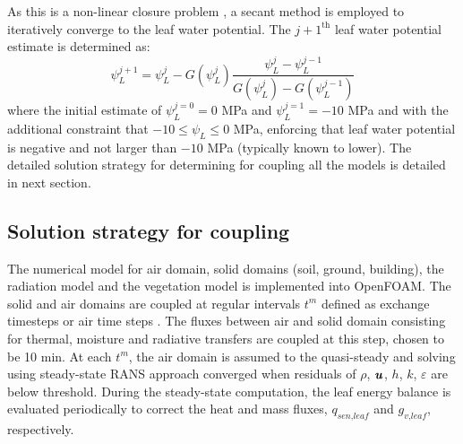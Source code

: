 As this is a non-linear closure problem \citep{Manoli2014},  a secant method is employed to iteratively converge to the leaf water potential. The $j+1^\mathrm{th}$ leaf water potential estimate is determined as:
\begin{equation}
\psi_L^{j+1} = \psi_L^{j} - G(\psi_L^j) \frac{\psi_L^j - \psi_L^{j-1}}{G\left(\psi_L^j\right) - G\left(\psi_L^{j-1}\right) }
\end{equation}
where the initial estimate of $\psi_L^{j=0} = 0$ MPa and $\psi_L^{j=1} = -10$ MPa and with the additional constraint that $-10 \le \psi_L \le 0$ MPa, enforcing that leaf water potential is negative and not larger than $-10$ MPa (typically known to lower). The detailed solution strategy for determining for coupling all the models is detailed in next section.

\subsection{Solution strategy for coupling}

The numerical model for air domain, solid domains (soil, ground, building), the radiation model and the vegetation model is implemented into OpenFOAM. The solid and air domains are coupled at regular intervals $t^m$ defined as exchange timesteps or air time steps \citep{Saneinejad2014,Kubilay2018}. The fluxes between air and solid domain consisting for thermal, moisture and radiative transfers are coupled at this step, chosen to be 10 min. At each $t^m$, the air domain is assumed to the quasi-steady and solving using steady-state RANS approach converged when residuals of $\rho$, $\textbf{\textit{u}}$, $h$, $k$, $\varepsilon$ are below threshold. During the steady-state computation, the leaf energy balance is evaluated periodically to correct the heat and mass fluxes, $q_{\textit{sen,leaf}}$ and $g_{\textit{v,leaf}}$, respectively. 

